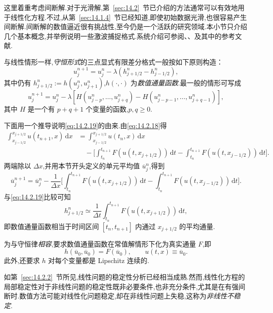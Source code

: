 这里着重考虑间断解.对于光滑解,第~\ref{sec:14.2}~节已介绍的方法通常可以有效地用于线性化方程.不过,从第~\ref{sec:14.1.4}~节已经知道,即使初始数据光滑,也很容易产生间断解.间断解的数值逼近很有挑战性,至今仍是一个活跃的研究领域.本小节只介绍几个基本概念,并举例说明一些激波捕捉格式.系统介绍可参阅、、及其中的参考文献.

与线性情形一样,\emph{守恒形式}的三点显式有限差分格式一般按如下原则构造：
\begin{equation}\label{eq:14.2.19}
  u_j^{n+1}=u_j^n-\lambda(h_{j+1/2}^n-h_{j-1/2}^n),
\end{equation}
其中仍有 \(h_{j+1/2}^n:=h(u_j^n,u_{j+1}^n)\),\(h(\cdot,\cdot)\) 为\emph{数值通量函数}.最一般的情形可写成
\[
  u_j^{n+1}=u_j^n-\lambda[H(u_{j-p}^n,\ldots,u_{j+q}^n)
                              -H(u_{j-p-1}^n,\ldots,u_{j+q-1}^n)],
\]
其中 \(H\) 是一个有 \(p+q+1\) 个变量的函数,\(p,q\ge0\).

下面用一个推导说明\eqref{eq:14.2.19}的由来.由\eqref{eq:14.2.18}得
\[
  \begin{aligned}
    \int_{x_{j-1/2}}^{x_{j+1/2}}u(t_{n+1},x)\,\mathrm dx
      &=\int_{x_{j-1/2}}^{x_{j+1/2}}u(t_n,x)\,\mathrm dx\\
      &\quad-\biggl[\int_{t_n}^{t_{n+1}}F(u(t,x_{j+1/2}))\,\mathrm dt
                -\int_{t_n}^{t_{n+1}}F(u(t,x_{j-1/2}))\,\mathrm dt\biggr].
  \end{aligned}
\]
两端除以 \(\Delta x\),并用本节开头定义的单元平均值 \(\overline u_j^n\),得到
\[
  \overline u_j^{n+1}=\overline u_j^n
    -\frac1{\Delta x}\biggl[\int_{t_n}^{t_{n+1}}F(u(t,x_{j+1/2}))\,\mathrm dt
                   -\int_{t_n}^{t_{n+1}}F(u(t,x_{j-1/2}))\,\mathrm dt\biggr].
\]
与\eqref{eq:14.2.19}比较可知
\[
  h_{j+1/2}^n\simeq\frac1{\Delta t}\int_{t_n}^{t_{n+1}}
                    F(u(t,x_{j+1/2}))\,\mathrm dt,
\]
即数值通量函数相当于时间区间 \([t_n,t_{n+1}]\) 内通过 \(x_{j+1/2}\) 的平均通量.

为与守恒律\emph{相容},要求数值通量函数在常值解情形下化为真实通量 \(F\),即
\begin{equation}\label{eq:14.2.20}
  h(\overline u_0,\overline u_0)=F(\overline u_0),
     \qquad u(t,x)\equiv\overline u_0.
\end{equation}
此外,还要求 \(h\) 对每个变量都是 Lipschitz 连续的.

如第~\ref{sec:14.2.2}~节所见,线性问题的稳定性分析已经相当成熟.然而,线性化方程的局部稳定性对于非线性问题的稳定性既非必要条件,也非充分条件,尤其是在有强间断时.数值方法可能对线性化问题稳定,却在非线性问题上失稳,这称为\emph{非线性不稳定}.

